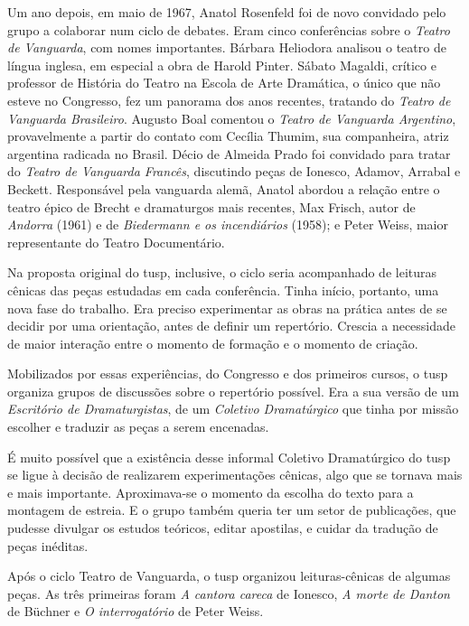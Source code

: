 Um ano depois, em maio de 1967, Anatol Rosenfeld foi de novo convidado
pelo grupo a colaborar num ciclo de debates. Eram cinco conferências
sobre o {\it Teatro de Vanguarda}, com nomes importantes. Bárbara
Heliodora analisou o teatro de língua inglesa, em especial a obra de
Harold Pinter. Sábato Magaldi, crítico e professor de História do Teatro
na Escola de Arte Dramática, o único que não esteve no Congresso, fez um
panorama dos anos recentes, tratando do {\it Teatro de Vanguarda
Brasileiro}. Augusto Boal comentou o {\it Teatro de Vanguarda
Argentino}, provavelmente a partir do contato com Cecília Thumim, sua
companheira, atriz argentina radicada no Brasil. Décio de Almeida Prado
foi convidado para tratar do {\it Teatro de Vanguarda Francês},
discutindo peças de Ionesco, Adamov, Arrabal e Beckett. Responsável pela
vanguarda alemã, Anatol abordou a relação entre o teatro épico de Brecht
e dramaturgos mais recentes, Max Frisch, autor de {\it Andorra} (1961) e
de {\it Biedermann e os incendiários} (1958); e Peter Weiss, maior
representante do Teatro Documentário.

Na proposta original do {\sc tusp}, inclusive, o ciclo seria acompanhado de
leituras cênicas das peças estudadas em cada conferência. Tinha início,
portanto, uma nova fase do trabalho. Era preciso experimentar as obras
na prática antes de se decidir por uma orientação, antes de definir um
repertório. Crescia a necessidade de maior interação entre o momento de
formação e o momento de criação.

Mobilizados por essas experiências, do Congresso e dos primeiros cursos,
o {\sc tusp} organiza grupos de discussões sobre o repertório possível. Era a
sua versão de um {\it Escritório de Dramaturgistas}, de um {\it Coletivo
Dramatúrgico} que tinha por missão escolher e traduzir as peças a serem
encenadas.

\subject{Formação do Coletivo Dramatúrgico e realização de leituras-cênicas}

É muito possível que a existência desse informal Coletivo Dramatúrgico
do {\sc tusp} se ligue à decisão de realizarem experimentações cênicas, algo
que se tornava mais e mais importante. Aproximava-se o momento da
escolha do texto para a montagem de estreia. E o grupo também queria ter
um setor de publicações, que pudesse divulgar os estudos teóricos,
editar apostilas, e cuidar da tradução de peças inéditas.

Após o ciclo Teatro de Vanguarda, o {\sc tusp} organizou leituras-cênicas de
algumas peças. As três primeiras foram {\it A cantora careca} de
Ionesco, {\it A morte de Danton} de Büchner e {\it O interrogatório} de
Peter Weiss.

